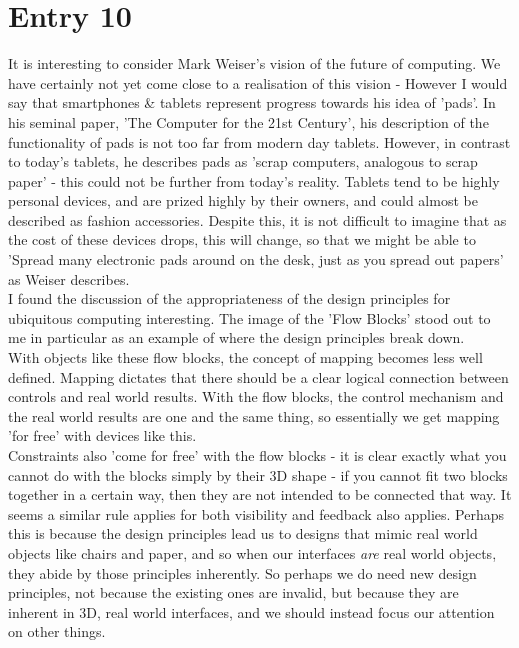 \documentclass{article}
\begin{document}
\section*{Entry 10}

\noindent It is interesting to consider Mark Weiser's vision of the future of computing. We have certainly not yet come close to a realisation of this vision - However I would say that smartphones \& tablets represent progress towards his idea of 'pads'. In his seminal paper, 'The Computer for the 21st Century', his description of the functionality of pads is not too far from modern day tablets. However, in contrast to today's tablets, he describes pads as 'scrap computers, analogous to scrap paper' - this could not be further from today's reality. Tablets tend to be highly personal devices, and are prized highly by their owners, and could almost be described as fashion accessories. Despite this, it is not difficult to imagine that as the cost of these devices drops, this will change, so that we might be able to 'Spread many electronic pads around on the desk, just as you spread out papers' as Weiser describes.
\\\indent I found the discussion of the appropriateness of the design principles for ubiquitous computing interesting. The image of the 'Flow Blocks' stood out to me in particular as an example of where the design principles break down.
\\\indent With objects like these flow blocks, the concept of mapping becomes less well defined. Mapping dictates that there should be a clear logical connection between controls and real world results. With the flow blocks, the control mechanism and the real world results are one and the same thing, so essentially we get mapping 'for free' with devices like this.
\\\indent Constraints also 'come for free' with the flow blocks - it is clear exactly what you cannot do with the blocks simply by their 3D shape - if you cannot fit two blocks together in a certain way, then they are not intended to be connected that way. It seems a similar rule applies for both visibility and feedback also applies. Perhaps this is because the design principles lead us to designs that mimic real world objects like chairs and paper, and so when our interfaces \emph{are} real world objects, they abide by those principles inherently. So perhaps we do need new design principles, not because the existing ones are invalid, but because they are inherent in 3D, real world interfaces, and we should instead focus our attention on other things.
\end{document}
